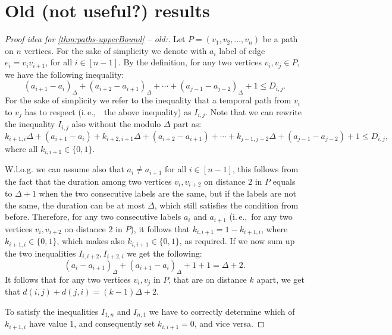\documentclass[a4paper,UKenglish,cleveref, autoref, thm-restate]{lipics-v2021}
\newcommand{\ie}{i.\,e.,\ }
\begin{document}
\section{Old (not useful?) results}
\begin{proof}[Proof idea for \cref{thm:paths-upperBound} -- old:]
	Let $P = (v_1, v_2, \dots, v_n)$ be a path on $n$ vertices.
	For the sake of simplicity we denote with $a_i$ label of edge $e_i =v_iv_{i+1}$, for all $i \in [n-1]$.
	By the definition, for any two vertices $v_i,v_j \in P$, we have the following inequality:
	\begin{equation*}
		(a_{i+1} - a_i)_\Delta + (a_{i+2} - a_{i+1})_\Delta + \cdots + (a_{j-1} - a_{j-2})_\Delta + 1
		\leq D_{i,j}.
	\end{equation*}
	For the sake of simplicity we refer to the inequality that a temporal path from $v_i$ to $v_j$ has to respect (\ie~the above inequality) 
	as $I_{i,j}$.
	Note that we can rewrite the inequality $I_{i,j}$ also without the modulo $\Delta$ part as:
	\begin{equation*}
		k_{i+1,i} \Delta + (a_{i+1} - a_i)+ k_{i+2,i+1} \Delta + (a_{i+2} - a_{i+1}) + \cdots + k_{j-1,j-2} \Delta + (a_{j-1} - a_{j-2})+ 1
		\leq D_{i,j},
	\end{equation*}
	where all $k_{i,i+1} \in \{0,1\}$.
	
	W.l.o.g. we can assume also that $a_i \neq a_{i+1}$ for all $i \in [n-1]$,
	this follows from the fact that the duration among two vertices $v_i, v_{i+2}$ on distance $2$ in $P$ equals to $\Delta + 1$ when the two consecutive labels are the same, but if the labels are not the same, the duration can be at most $\Delta$, which still satisfies the condition from before.
	Therefore, for any two consecutive labels $a_i$ and $a_{i+1}$ (\ie for any two vertices $v_i, v_{i+2}$ on distance $2$ in $P$), 
	it follows that 
	$k_{i, i+1} = 1 - k_{i+1,i}$, where $k_{i+1,i} \in \{0,1\}$, which makes also $k_{i,i+1} \in \{0,1\}$, as required.
	If we now sum up the two inequalities $I_{i,i+2}, I_{i+2,i}$ we get the following:
	\begin{equation*}
		(a_i-a_{i+1})_\Delta + (a_{i+1}-a_i)_\Delta +1 +1 = \Delta + 2.
	\end{equation*}
	It follows that for any two vertices $v_i, v_j$ in $P$, that are on distance $k$ apart, 
	we get that $d(i,j) + d(j,i) = (k-1) \Delta + 2$.
	
	To satisfy the inequalities $I_{1,n}$ and $I_{n,1}$ we have to correctly determine which of $k_{i+1,i}$ have value $1$, and consequently set $k_{i,i+1} = 0$,
	and vice versa.
	

\end{proof}
\end{document}

